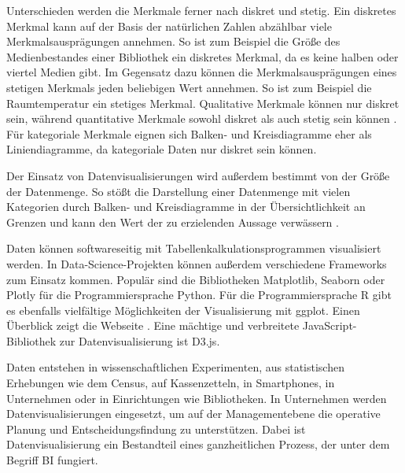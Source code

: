 Unterschieden werden die Merkmale ferner nach diskret und stetig.
Ein diskretes Merkmal kann auf der Basis der natürlichen Zahlen abzählbar viele Merkmalsausprägungen annehmen.
So ist zum Beispiel die Größe des Medienbestandes einer Bibliothek ein diskretes Merkmal, da es keine halben oder viertel Medien gibt.
Im Gegensatz dazu können die Merkmalsausprägungen eines stetigen Merkmals jeden beliebigen Wert annehmen. So ist zum Beispiel die Raumtemperatur ein stetiges Merkmal.
Qualitative Merkmale können nur diskret sein, während quantitative Merkmale sowohl diskret als auch stetig sein können \cite[vgl.][102 f.]{kirk_data_2019}. 
Für kategoriale Merkmale eignen sich Balken- und Kreisdiagramme eher als Liniendiagramme, da kategoriale Daten nur diskret sein können.

Der Einsatz von Datenvisualisierungen wird außerdem bestimmt von der Größe der Datenmenge.
So stößt die Darstellung einer Datenmenge mit vielen Kategorien durch Balken- und Kreisdiagramme 
in der Übersichtlichkeit an Grenzen und kann den Wert der zu erzielenden Aussage verwässern \cite[Vgl.][5 ff.]{few_show_2012}. 

Daten können softwareseitig mit Tabellenkalkulationsprogrammen visualisiert werden.
In Data-Science-Projekten können außerdem verschiedene Frameworks zum Einsatz kommen. Populär sind die Bibliotheken Matplotlib, Seaborn oder Plotly für 
die Programmiersprache Python. Für die Programmiersprache R gibt es ebenfalls vielfältige Möglichkeiten der Visualisierung mit
ggplot. Einen Überblick zeigt die Webseite  \cite{witherley_chartmaker_2020}.
Eine mächtige und verbreitete JavaScript-Bibliothek zur Datenvisualisierung ist D3.js.


Daten entstehen in wissenschaftlichen Experimenten, aus statistischen Erhebungen wie 
dem Census, auf Kassenzetteln, in Smartphones, in Unternehmen oder in Einrichtungen wie Bibliotheken. 
In Unternehmen werden Datenvisualisierungen eingesetzt, um auf der Managementebene die operative Planung und Entscheidungsfindung zu unterstützen.
Dabei ist Datenvisualisierung ein Bestandteil eines ganzheitlichen Prozess, der unter dem Begriff \acrfull{BI} fungiert. 


